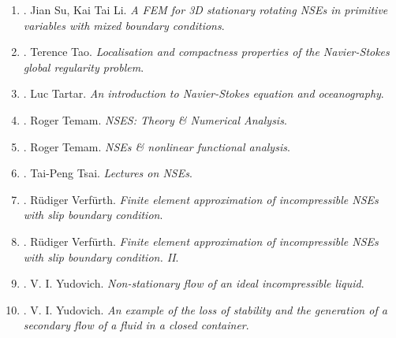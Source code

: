 \documentclass{article}
\begin{document}
\begin{enumerate}
	{\sf Primary objective.} To develop an elementary \& self-contained approach to the mathematical theory of a viscous incompressible fluid in a domain $\Omega\subset\mathbb{R}^d$, described by NSEs. Formulate the theory for a completely general domain $\Omega$.
	\item \cite{Su_Li2008}. {\sc Jian Su, Kai Tai Li}. {\it A FEM for 3D stationary rotating NSEs in primitive variables with mixed boundary conditions}.
	\item \cite{Tao2013}. {\sc Terence Tao}. {\it Localisation and compactness properties of the Navier-Stokes global regularity problem}.
	\item \cite{Tartar2006}. {\sc Luc Tartar}. {\it An introduction to {N}avier-{S}tokes equation and oceanography}.
	\item \cite{Temam1977,Temam2000}. {\sc Roger Temam}. {\it NSES: Theory \& Numerical Analysis}.
	\item \cite{Temam1983,Temam1995}. {\sc Roger Temam}. {\it NSEs \& nonlinear functional analysis}.
	\item \cite{Tsai2018}. {\sc Tai-Peng Tsai}. {\it Lectures on NSEs}.
	\item \cite{Verfurth1987}. {\sc R\"{u}diger Verf\"{u}rth}. {\it Finite element approximation of incompressible NSEs with slip boundary condition}.
	\item \cite{Verfurth1991}. {\sc R\"{u}diger Verf\"{u}rth}. {\it Finite element approximation of incompressible NSEs with slip boundary condition. II}.
	\item \cite{Yudovich1963}. {\sc V. I. Yudovich}. {\it Non-stationary flow of an ideal incompressible liquid}.
	\item \cite{Yudovich1967}. {\sc V. I. Yudovich}. {\it An example of the loss of stability and the generation of a secondary flow of a fluid in a closed container}.
\end{enumerate}
\end{document}
